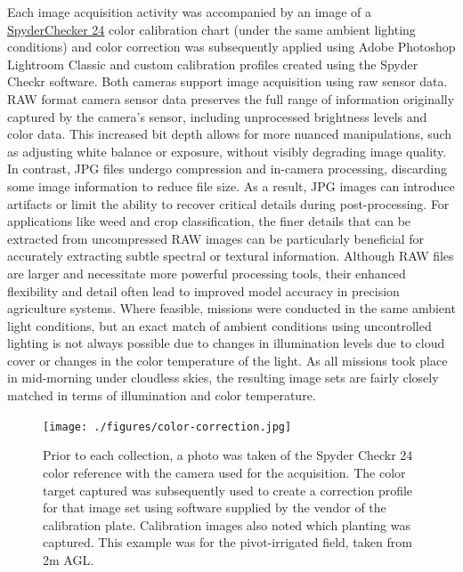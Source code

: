 \documentclass[letterpaper, notitlepage]{report}
\begin{document}
Each image acquisition activity was accompanied by an image of a \href{https://www.datacolor.com/spyder/products/spyder-checkr-photo/} {SpyderChecker 24} color calibration chart (under the same ambient lighting conditions) and color correction was subsequently applied using Adobe Photoshop Lightroom Classic and custom calibration profiles created using the Spyder Checkr software.  Both cameras support image acquisition using raw sensor data. RAW format camera sensor data preserves the full range of information originally captured by the camera’s sensor, including unprocessed brightness levels and color data. This increased bit depth allows for more nuanced manipulations, such as adjusting white balance or exposure, without visibly degrading image quality. In contrast, JPG files undergo compression and in-camera processing, discarding some image information to reduce file size. As a result, JPG images can introduce artifacts or limit the ability to recover critical details during post-processing. For applications like weed and crop classification, the finer details that can be extracted from uncompressed RAW images can be particularly beneficial for accurately extracting subtle spectral or textural information. Although RAW files are larger and necessitate more powerful processing tools, their enhanced flexibility and detail often lead to improved model accuracy in precision agriculture systems. Where feasible, missions were conducted in the same ambient light conditions, but an exact match of ambient conditions using uncontrolled lighting is not always possible due to changes in illumination levels due to cloud cover or changes in the color temperature of the light. As all missions took place in mid-morning under cloudless skies, the resulting image sets are fairly closely matched in terms of illumination and color temperature.


\begin{figure}[!htb]
	\centering
	\texttt{[image: ./figures/color-correction.jpg]}
	\caption[Color correction target and image set identification]{Prior to each collection, a photo was taken of the Spyder Checkr 24 color reference with the camera used for the acquisition. The color target captured was subsequently used to create a correction profile for that image set using software supplied by the vendor of the calibration plate. Calibration images also noted which planting was captured. This example was for the pivot-irrigated field, taken from 2m \gls{AGL}.}
	\label{fig:color-correction}
\end{figure}
\end{document}
